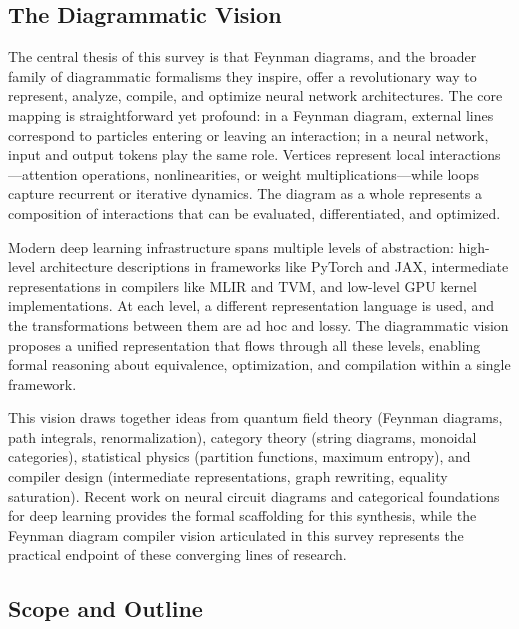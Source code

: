\documentclass[12pt,a4paper]{article}
\begin{document}
\subsection{The Diagrammatic Vision}

The central thesis of this survey is that Feynman diagrams, and the broader family of diagrammatic formalisms they inspire, offer a revolutionary way to represent, analyze, compile, and optimize neural network architectures. The core mapping is straightforward yet profound: in a Feynman diagram, external lines correspond to particles entering or leaving an interaction; in a neural network, input and output tokens play the same role. Vertices represent local interactions---attention operations, nonlinearities, or weight multiplications---while loops capture recurrent or iterative dynamics. The diagram as a whole represents a composition of interactions that can be evaluated, differentiated, and optimized.

Modern deep learning infrastructure spans multiple levels of abstraction: high-level architecture descriptions in frameworks like PyTorch and JAX, intermediate representations in compilers like MLIR and TVM, and low-level GPU kernel implementations. At each level, a different representation language is used, and the transformations between them are ad hoc and lossy. The diagrammatic vision proposes a unified representation that flows through all these levels, enabling formal reasoning about equivalence, optimization, and compilation within a single framework.

This vision draws together ideas from quantum field theory (Feynman diagrams, path integrals, renormalization), category theory (string diagrams, monoidal categories), statistical physics (partition functions, maximum entropy), and compiler design (intermediate representations, graph rewriting, equality saturation). Recent work on neural circuit diagrams \cite{abbott2024neural} and categorical foundations for deep learning \cite{crescenzi2024towards} provides the formal scaffolding for this synthesis, while the Feynman diagram compiler vision articulated in this survey represents the practical endpoint of these converging lines of research.

\subsection{Scope and Outline}
\end{document}

